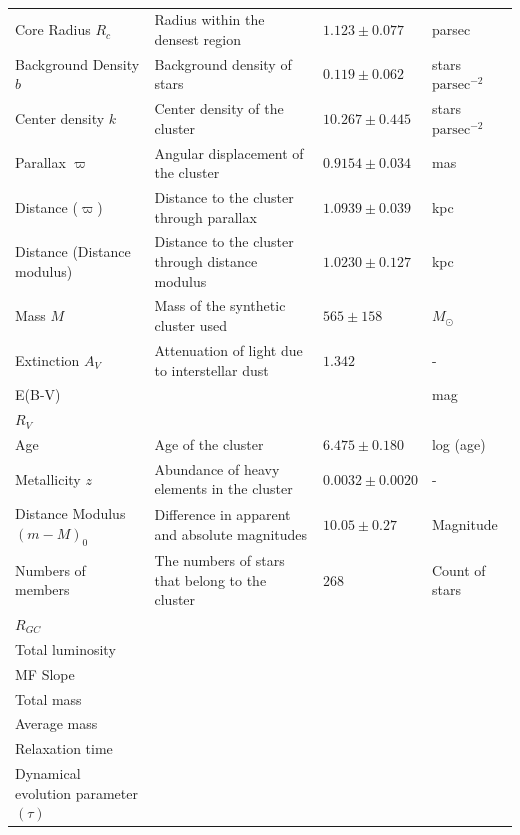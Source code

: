 \documentclass[fleqn,usenatbib,usedcolumn,useAMS]{mnras}
\begin{document}
\begin{table}
{\begin{tabular}{@{}llll@{}}
			Core Radius $R_c$ & Radius within the densest region & $1.123 \pm 0.077$ & parsec \\
			Background Density $b$ & Background density of stars & $0.119 \pm 0.062 $ & stars $\mathrm{parsec}^{-2}$ \\
			Center density $k$ & Center density of the cluster & $10.267 \pm 0.445$ & stars $\mathrm{parsec}^{-2}$ \\
			Parallax $\varpi$ & Angular displacement of the cluster & $0.9154 \pm 0.034$ & mas \\
			Distance ($\varpi$) & Distance to the cluster through parallax & $1.0939 \pm 0.039$ & kpc \\
			Distance (Distance modulus) & Distance to the cluster through distance modulus & $1.0230  \pm 0.127$ & kpc \\
			Mass $M$ & Mass of the synthetic cluster used & $565 \pm 158$ & $M_\odot$ \\
			Extinction $A_V$ & Attenuation of light due to interstellar dust & $1.342$ & - \\
			E(B-V) &  &  & mag \\
			$R_V$ &  &  &  \\
			Age & Age of the cluster & $6.475 \pm 0.180$ & log (age) \\
			Metallicity $z$ & Abundance of heavy elements in the cluster & $0.0032 \pm 0.0020$ & - \\
			Distance Modulus $(m-M)_0$ & Difference in apparent and absolute magnitudes & $10.05 \pm 0.27$ & Magnitude \\
			Numbers of members & The numbers of stars that belong to the cluster & $268$ & Count of stars \\
			$R_{GC}$ &  &  &  \\
			Total luminosity &  &  &  \\
			MF Slope &  &  &  \\
			Total mass &  &  &  \\
			Average mass &  &  &  \\
			Relaxation time &  &  &  \\
			Dynamical evolution parameter $(\tau)$ &  &  &  \\ \bottomrule
		\end{tabular}%
	}
	\caption{}
	\label{tab:results}
\end{table}
\end{document}

